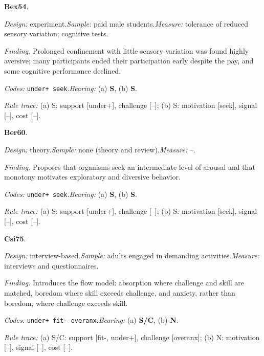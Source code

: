 \noindent\textbf{Bex54}\enspace \citet{Bexton1954}.\par
{\small\noindent\textit{Design:} experiment.\quad \textit{Sample:} paid male students.\quad \textit{Measure:} tolerance of reduced sensory variation; cognitive tests.\par
\noindent\textit{Finding.} Prolonged confinement with little sensory variation was found highly aversive; many participants ended their participation early despite the pay, and some cognitive performance declined.\par
\noindent\textit{Codes:} \texttt{under+ seek}.\quad \textit{Bearing:} (a) \textbf{S}, (b) \textbf{S}.\par
\noindent\textit{Rule trace:} (a) S: support {[}under+{]}, challenge {[}--{]}; (b) S: motivation {[}seek{]}, signal {[}--{]}, cost {[}--{]}.\par}
\medskip
{}
\noindent\textbf{Ber60}\enspace \citet{Berlyne1960}.\par
{\small\noindent\textit{Design:} theory.\quad \textit{Sample:} none (theory and review).\quad \textit{Measure:} --.\par
\noindent\textit{Finding.} Proposes that organisms seek an intermediate level of arousal and that monotony motivates exploratory and diversive behavior.\par
\noindent\textit{Codes:} \texttt{under+ seek}.\quad \textit{Bearing:} (a) \textbf{S}, (b) \textbf{S}.\par
\noindent\textit{Rule trace:} (a) S: support {[}under+{]}, challenge {[}--{]}; (b) S: motivation {[}seek{]}, signal {[}--{]}, cost {[}--{]}.\par}
\medskip
{}
\noindent\textbf{Csi75}\enspace \citet{Csikszentmihalyi1975}.\par
{\small\noindent\textit{Design:} interview-based.\quad \textit{Sample:} adults engaged in demanding activities.\quad \textit{Measure:} interviews and questionnaires.\par
\noindent\textit{Finding.} Introduces the flow model: absorption where challenge and skill are matched, boredom where skill exceeds challenge, and anxiety, rather than boredom, where challenge exceeds skill.\par
\noindent\textit{Codes:} \texttt{under+ fit- overanx}.\quad \textit{Bearing:} (a) \textbf{S/C}, (b) \textbf{N}.\par
\noindent\textit{Rule trace:} (a) S/C: support {[}fit-, under+{]}, challenge {[}overanx{]}; (b) N: motivation {[}--{]}, signal {[}--{]}, cost {[}--{]}.\par}
